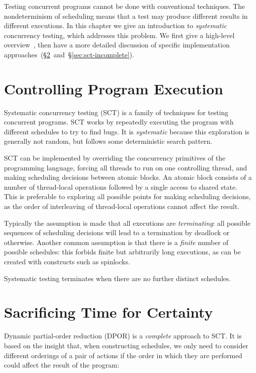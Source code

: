 Testing concurrent programs cannot be done with conventional techniques.  The
nondeterminism of scheduling means that a test may produce different results in
different executions.  In this chapter we give an introduction
to \emph{systematic} concurrency testing, which addresses this problem.  We
first give a high-level overview~, then have a more
detailed discussion of specific implementation
approaches~(\S\ref{sec:sct-complete}~and~\S\ref{sec:sct-incomplete}).

\section{Controlling Program Execution}
\label{sec:sct-fundamentals}

Systematic concurrency testing
(SCT)\cite{coons2013,musuvathi2008,musuvathi2007,flanagan2005} is a family of
techniques for testing concurrent programs.  SCT works by repeatedly executing
the program with different schedules to try to find bugs.  It is
\emph{systematic} because this exploration is generally not random, but follows
some deterministic search pattern.

SCT can be implemented by overriding the concurrency primitives of the
programming language, forcing all threads to run on one controlling thread, and
making scheduling decisions between atomic blocks.  An atomic block consists of
a number of thread-local operations followed by a single access to shared state.
This is preferable to exploring all possible points for making scheduling
decisions, as the order of interleaving of thread-local operations cannot affect
the result.

Typically the assumption is made that all executions are \emph{terminating}: all
possible sequences of scheduling decisions will lead to a termination by
deadlock or otherwise.  Another common assumption is that there is a
\emph{finite} number of possible schedules: this forbids finite but arbitrarily
long executions, as can be created with constructs such as spinlocks.

Systematic testing terminates when there are no further distinct schedules.

\section{Sacrificing Time for Certainty}
\label{sec:sct-complete}

Dynamic partial-order reduction (DPOR)\cite{flanagan2005,godefroid1996} is a
\emph{complete} approach to SCT\@.  It is based on the insight that, when
constructing schedules, we only need to consider different orderings of a pair
of actions if the order in which they are performed could affect the result of
the program:

